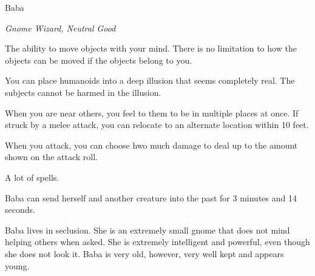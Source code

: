 \begin{monsterbox}{Baba}
	\begin{hangingpar}
		\textit{Gnome Wizard, Neutral Good}
	\end{hangingpar}
	\dndline%
	\basics[%
	armorclass = 24,
	hitpoints  = 302,
	speed      = 60 ft
	]
	\dndline%
	\stats[
	STR = \stat{8}, %
	DEX = \stat{16},
	CON = \stat{19},
	INT = \stat{20},
	WIS = \stat{20},
	CHA = \stat{19}
	]
	\dndline%
	\details[%
	languages = {Common, Elvish, Dwarvish, Gnomish, Halfling, Orc, Pandaren, Celestial, Draconic, Primordial},
	challenge = 20
	]
	\dndline%
	\begin{monsteraction}[Telekinesis]
		The ability to move objects with your mind. There is no limitation to how the objects can be moved if the objects belong to you.
	\end{monsteraction}	
	\begin{monsteraction}
		You can place humanoids into a deep illusion that seems completely real. The subjects cannot be harmed in the illusion.
	\end{monsteraction}	
	\begin{monsteraction}
		When you are near others, you feel to them to be in multiple places at once. If struck by a melee attack, you can relocate to an alternate location within 10 feet.
	\end{monsteraction}
	\begin{monsteraction}
		When you attack, you can choose hwo much damage to deal up to the amount shown on the attack roll.
	\end{monsteraction}
	\begin{monsteraction}[Spells]
		A lot of spells.
	\end{monsteraction}
	\begin{monsteraction}
		Baba can send herself and another creature into the past for 3 minutes and 14 seconds. 
	\end{monsteraction}
	Baba lives in seclusion. She is an extremely small gnome that does not mind helping others when asked. She is extremely intelligent and powerful, even though she does not look it. Baba is very old, however, very well kept and appears young.
\end{monsterbox}

